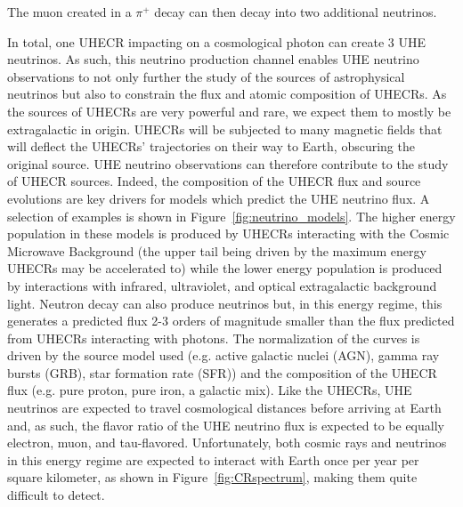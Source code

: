  \noindent 
  The muon created in a $\pi^+$ decay can then decay into two additional neutrinos.
  \begin{center}  
  \end{center}
  
  \noindent In total, one UHECR impacting on a cosmological photon can create 3 UHE neutrinos. 
  As such, this neutrino production channel enables UHE neutrino observations to not only further the study of the sources of astrophysical neutrinos but also to constrain the flux and atomic composition of UHECRs. 
  As the sources of UHECRs are very powerful and rare, we expect them to mostly be extragalactic in origin. 
  UHECRs will be subjected to many magnetic fields that will deflect the UHECRs' trajectories on their way to Earth, obscuring the original source.
  UHE neutrino observations can therefore contribute to the study of UHECR sources.
  Indeed, the composition of the UHECR flux and source evolutions are key drivers for models which predict the UHE neutrino flux. 
  A selection of examples is shown in Figure~\ref{fig:neutrino_models}. 
  The higher energy population in these models is produced by UHECRs interacting with the Cosmic Microwave Background (the upper tail being driven by the maximum energy UHECRs may be accelerated to) while the lower energy population is produced by interactions with infrared, ultraviolet, and optical extragalactic background light. 
  Neutron decay can also produce neutrinos but, in this energy regime, this generates a predicted flux 2-3 orders of magnitude smaller than the flux predicted from UHECRs interacting with photons. 
  The normalization of the curves is driven by the source model used (e.g. active galactic nuclei (AGN), gamma ray bursts (GRB), star formation rate (SFR)) and the composition of the UHECR flux (e.g. pure proton, pure iron, a galactic mix).
  Like the UHECRs, UHE neutrinos are expected to travel cosmological distances before arriving at Earth and, as such, the flavor ratio of the UHE neutrino flux is expected to be equally electron, muon, and tau-flavored. 
  Unfortunately, both cosmic rays and neutrinos in this energy regime are expected to interact with Earth once per year per square kilometer, as shown in Figure~\ref{fig:CRspectrum}, making them quite difficult to detect.

